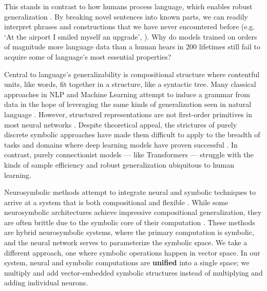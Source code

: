 This stands in contrast to how humans process language, which enables robust generalization \citep{pinker2003language}. By breaking novel sentences into known parts, we can readily interpret phrases and constructions that we have never encountered before (e.g. `At the airport I smiled myself an upgrade', \citep{goldberg_constructions_2006}). Why do models trained on orders of magnitude more language data than a human hears in 200 lifetimes \citep{Griffiths2020UnderstandingHI} still fail to acquire some of language's most essential properties?

Central to language's generalizability is compositional structure \citep{partee1995lexical} where contentful units, like words, fit together in a structure, like a syntactic tree. Many classical approaches in NLP and Machine Learning attempt to induce a grammar from data in the hope of leveraging the same kinds of generalization seen in natural language \citep[e.g.][]{ klein2002generative, kim2019compound, steedman1987combinatory}. However, structured representations are not first-order primitives in most neural networks \citep{Marcus2001-MARTAM-10, Smolensky_1988}. Despite theoretical appeal, the strictures of purely discrete symbolic approaches have made them difficult to apply to the breadth of tasks and domains where deep learning models have proven successful \citep{furrer2020compositional}. In contrast, purely connectionist models --- like Transformers \citep{vaswani2017attention} --- struggle with the kinds of sample efficiency and robust generalization ubiquitous to human learning. 

Neurosymbolic methods attempt to integrate neural and symbolic techniques to arrive at a system that is both compositional and flexible \citep{nslr,garcez2008neural,GARNELO201917, Smolensky_1988}. While some neurosymbolic architectures achieve impressive compositional generalization, they are often brittle due to the symbolic core of their computation \citep{shaw-etal-2021-compositional}. These methods are hybrid neurosymbolic systems, where the primary computation is symbolic, and the neural network serves to parameterize the symbolic space. We take a different approach, one where symbolic operations happen in vector space. In our system, neural and symbolic computations are \textbf{unified} into a single space; we multiply and add vector-embedded symbolic structures instead of multiplying and adding individual neurons. %

